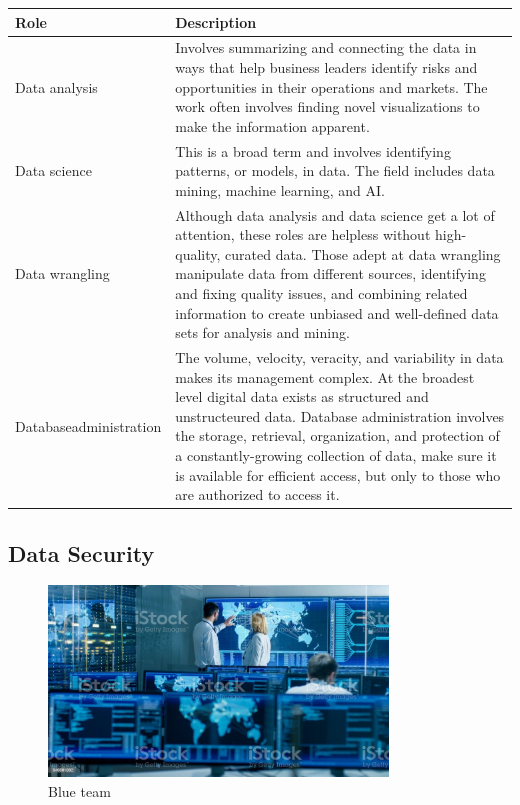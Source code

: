 \begin{table}[H]
	\begin{center}
		\begin{tabular}{p{1in}|p{3.4in}} 
			\textbf{Role} & \textbf{Description}\\
			\hline
			Data analysis & Involves summarizing and connecting the data in ways that help business leaders identify risks and opportunities in their operations and markets. The work often involves finding novel visualizations to make the information apparent.\\
			\hline
			Data science & This is a broad term and involves identifying patterns, or models, in data. The field includes data mining, machine learning, and AI.\\
			\hline
			Data wrangling & Although data analysis and data science get a lot of attention, these roles are helpless without high-quality, curated data. Those adept at data wrangling manipulate data from different sources, identifying and fixing quality issues, and combining related information to create unbiased and well-defined data sets for analysis and mining.\\
			\hline
			Database\linebreak administration & The volume, velocity, veracity, and variability in data makes its management complex. At the broadest level digital data exists as structured and unstructeured data. Database administration involves the storage, retrieval, organization, and protection of a constantly-growing collection of data, make sure it is available for efficient access, but only to those who are authorized to access it.\\
			\hline
		\end{tabular}
	\end{center}
\end{table}

\subsection{Data Security}

\begin{figure}[H]
	\begin{center}
		\caption{Blue team}
		\vskip 4pt
		\includegraphics[height=2in]{images/careers/istockphoto-949581032-1024x1024.jpg}
	\end{center}
\end{figure}

